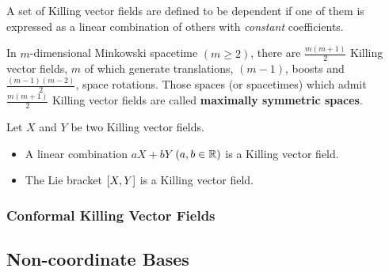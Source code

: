 \documentclass[10pt]{article}
\begin{document}
A set of Killing vector fields are defined to be dependent if one of them is expressed as a linear combination of others with \textit{constant} coefficients.

In $m$-dimensional Minkowski spacetime $(m\geq2)$, there are $\frac{m(m+1)}{2}$ Killing vector fields, $m$ of which generate translations, $(m-1)$, boosts and $\frac{(m-1)(m-2)}{2}$, space rotations.
Those spaces (or spacetimes) which admit $\frac{m(m + 1)}{2}$ Killing vector fields are called \textbf{maximally symmetric spaces}.

\begin{property}
    Let $X$ and $Y$ be two Killing vector fields.
    \begin{itemize}
        \item A linear combination $aX+bY$ $(a,b\in\mathbb{R})$ is a Killing vector field.
        \item The Lie bracket $\comm{X}{Y}$ is a Killing vector field.
    \end{itemize}
\end{property}

\subsubsection{Conformal Killing Vector Fields}
\subsection{Non-coordinate Bases}
\end{document}
